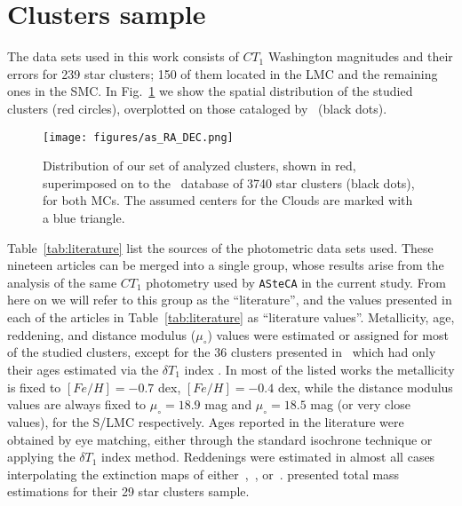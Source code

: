 \documentclass{aa}
\begin{document}

\section{Clusters sample}
\label{sec:clust-sample}

The data sets used in this work consists of $CT_1$ Washington magnitudes and
their errors for 239 star clusters; 150 of them located in the LMC and the
remaining ones in the SMC.\@
%
In Fig.~\ref{fig:ra-dec} we show the spatial distribution of the studied
clusters (red circles), overplotted on those cataloged by~\cite{Bica_2008} 
(black dots).

\begin{figure}
\centering
\texttt{[image: figures/as\_RA\_DEC.png]}
\caption{Distribution of our set of analyzed clusters, shown in red,
superimposed  on to the~\cite{Bica_2008} database of 3740 star clusters (black
dots), for both MCs. The assumed centers for the Clouds are marked with a blue
triangle.}
\label{fig:ra-dec}
\end{figure}

Table~\ref{tab:literature} list the sources of the photometric data sets used.
These nineteen articles can be merged into a single group, whose results
arise from the analysis of the same $CT_1$ photometry used by \texttt{ASteCA} in
the current study. From here on we will refer to this group as the
``literature'', and the values presented in each of the articles in
Table~\ref{tab:literature} as ``literature values''.
%
Metallicity, age, reddening, and distance modulus ($\mu_{\circ}$) values
were estimated or assigned for most of the studied clusters, except for the 36
clusters presented in~\cite{Piatti_2011b} which had only their ages estimated
via the $\delta T_1$ index \citep{Phelps_1994,Geisler_1997}.
In most of the listed works the metallicity is fixed to $[Fe/H]{=}-0.7$ dex,
$[Fe/H]{=}-0.4$ dex, while the distance modulus values are always fixed to
$\mu_{\circ}{=}18.9$ mag and $\mu_{\circ}{=}18.5$ mag (or very close values),
for the S/LMC respectively.
Ages reported in the literature were obtained by eye matching, either through
the standard isochrone technique or applying the $\delta T_1$ index method.
Reddenings were estimated in almost all cases interpolating the extinction maps
of either~\cite{Burstein_1982},~\cite{Schlegel_1998}, or~\cite{Haschke_2011}.
%
\cite{Maia_2013} presented total mass estimations for their 29 star clusters
sample.
\end{document}

